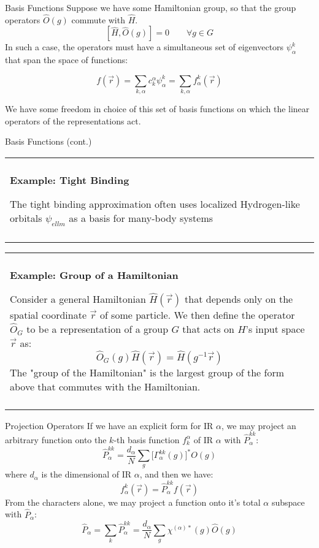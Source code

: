 \documentclass[11pt]{beamer}
\newenvironment{boxed2}
    {\begin{center}
    \begin{tabular}{|p{0.95\textwidth}|}
    \hline\\
    }
    { 
    \\\\\hline
    \end{tabular} 
    \end{center}
    }
\begin{document}
\begin{frame}{Basis Functions}
	Suppose we have some Hamiltonian group, so that the group operators $\hat{O}(g)$ commute with $\hat{H}$.
	$$
	[\hat{H},\hat{O}(g)] = 0 \quad \quad \forall g \in G
	$$
	In such a case, the operators must have a simultaneous set of eigenvectors $\psi^{k}_{\alpha}$ that span the space of functions:
	
	$$
	f(\vec{r})=\sum_{k,\alpha}c_{k}^{\alpha}\psi^{k}_{\alpha} =\sum_{k,\alpha}f^k_{\alpha}(\vec{r})
	$$
	
	\medskip
	
	We have some freedom in choice of this set of basis functions on which the linear operators of the representations act.
\end{frame}

\begin{frame}{Basis Functions (cont.)}
		\small
	\begin{boxed2}
		
		\vspace{-.41cm}
		
		\textbf{Example: Tight Binding} 
		
		The tight binding approximation often uses localized Hydrogen-like orbitals $\psi_{ell m}$ as a basis for many-body systems
		
		\vspace{-.3cm}
		
	\end{boxed2}
	
	\begin{boxed2}
		
		\vspace{-.5cm}
		
		\textbf{Example: Group of a Hamiltonian}
		
		Consider a general Hamiltonian $\hat{H}(\vec{r})$ that depends only on the spatial coordinate $\vec{r}$ of some particle. We then define the operator $\hat{O}_G$ to be a representation of a group $G$ that acts on $H$'s input space $\vec{r}$ as:
		$$
		\hat{O}_G(g)\hat{H}(\vec{r}) = \hat{H}(g^{-1}\vec{r})
		$$
		The "group of the Hamiltonian" is the largest group of the form above that commutes with the Hamiltonian.
	\end{boxed2}
\end{frame}

\begin{frame}{Projection Operators}
	If we have an explicit form for IR $\alpha$, we may project an arbitrary function onto the $k$-th basis function $f^{\alpha}_k$ of IR $\alpha$ with $\hat{P}_{\alpha}^{kk}$:
	$$
	\hat{P}_{\alpha}^{kk} = \frac{d_{\alpha}}{N}\sum_g \big[\Gamma^{kk}_{\alpha}(g) \big]^* O(g)
	$$
	where $d_{\alpha}$ is the dimensional of IR $\alpha$, and then we have:
	$$
	f_{\alpha}^k(\vec{r}) = \hat{P}_{\alpha}^{kk}f(\vec{r})
	$$
	From the characters alone, we may project a function onto it's total $\alpha$ subspace with $\hat{P}_{\alpha}$:
	$$
	\hat{P}_{\alpha} = \sum_k\hat{P}^{kk}_{\alpha} = \frac{d_{\alpha}}{N}\sum_{g}\chi^{(\alpha)*}(g)\hat{O}(g)
	$$


\end{frame}
\end{document}
